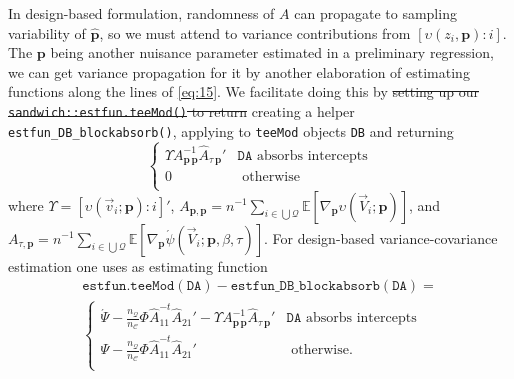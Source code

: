 \documentclass{article}
\newcommand{\absorbInterceptsEF}{\upsilon}
\newcommand{\AbsorbInterceptsEF}{\Upsilon}
\begin{document}
In design-based formulation, randomness of $A$ can propagate to
sampling variability of $\hat{\mathbf{p}}$,  so we must attend to
variance contributions from $[\absorbInterceptsEF(z_{i}, \mathbf{p}): i]$. 
The $\mathbf{p}$ being another nuisance parameter estimated in a
preliminary regression, we can get variance propagation for it by
another elaboration of estimating functions along the lines of
\eqref{eq:15}. We facilitate doing
this by \st{setting up our
\texttt{sandwich::estfun.teeMod()} to return} creating a
helper \texttt{estfun\_DB\_blockabsorb()}, applying to
\texttt{teeMod} objects \texttt{DB} and returning
\begin{equation*}
\begin{cases}
  \AbsorbInterceptsEF{}
  A_{\mathbf{p}\,\mathbf{p}}^{-1}\hat{A}_{\tau\,\mathbf{p}}' &
  \mathtt{DA} \text{ absorbs intercepts}\\
0 & \text{ otherwise}\\
\end{cases}
\end{equation*}
where 
$\AbsorbInterceptsEF= [\absorbInterceptsEF(\vec{v}_{i}; \mathbf{p}): i]'$, 
$A_{\mathbf{p}, \mathbf{p}} = n^{-1}\sum_{i\in \bigcup
  \mathcal{Q}}\mathbb{E} [\nabla_{\mathbf{p}}\absorbInterceptsEF(\vec{V}_{i};
\mathbf{p})]$, and $A_{\tau, \mathbf{p}} = n^{-1} \sum_{i\in \bigcup
  \mathcal{Q}}\mathbb{E}[\nabla_{\mathbf{p}}\acute{\psi}(\vec{V}_{i};
\mathbf{p}, \beta, \tau)]$.  For design-based variance-covariance
estimation one uses as estimating function
\begin{multline*}\label{eq:25}
  \mathtt{estfun.teeMod(DA)} -
  \mathtt{estfun\_DB\_blockabsorb(DA)} =\\
\begin{cases}
\acute{\Psi} -
  \frac{n_{\mathcal{Q}}}{n_{\mathcal{C}}}\Phi
  \hat{A}_{11}^{-t}\hat{A}_{21}'  - \AbsorbInterceptsEF{}
  A_{\mathbf{p}\,\mathbf{p}}^{-1}\hat{A}_{\tau\,\mathbf{p}}' & \mathtt{DA} \text{ absorbs intercepts}\\
 \Psi -
  \frac{n_{\mathcal{Q}}}{n_{\mathcal{C}}}\Phi
  \hat{A}_{11}^{-t}\hat{A}_{21}' 
 & \text{ otherwise}.\\
\end{cases}
\end{multline*}
\end{document}
